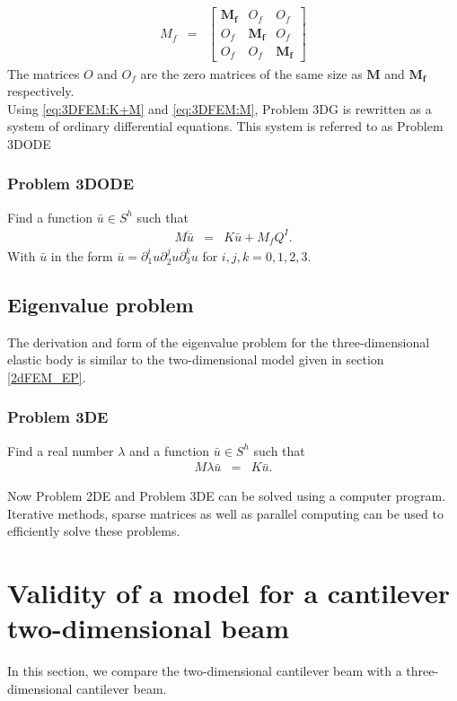 \begin{eqnarray}
	M_f & = &
	\begin{bmatrix}
		\mathbf{M_f} & {O_f} & {O_f}\\
		{O_f} & \mathbf{M_f} & {O_f}\\
		{O_f} & {O_f} & \mathbf{M_f}
	\end{bmatrix}\label{eq:3DFEM:M}
\end{eqnarray}
The matrices ${O}$ and ${O_f}$ are the zero matrices of the same size as $\mathbf{M}$ and $\mathbf{M_f}$ respectively.\\

Using \eqref{eq:3DFEM:K+M} and \eqref{eq:3DFEM:M}, Problem 3DG is rewritten as a system of ordinary differential equations. This system is referred to as Problem 3DODE

\subsubsection*{Problem 3DODE}
Find a function $\bar{u} \in S^h$ such that
\begin{eqnarray}
	M\ddot{\bar{u}} & = & K\bar{u} + M_{f}Q^I. \label{3D_M}
\end{eqnarray} With $\bar{u}$ in the form $\bar{u} = \partial^i_1u \partial^j_2u \partial^k_3u$ for $i,j,k = 0,1,2,3$.

\subsection*{Eigenvalue problem}
The derivation and form of the eigenvalue problem for the three-dimensional elastic body is similar to the two-dimensional model given in section \ref{2dFEM_EP}.

\subsubsection*{Problem 3DE}\label{3dFEM_EP}
Find a real number $\lambda$ and a function $\bar{u} \in S^h$ such that
\begin{eqnarray}
	M\lambda{\bar{u}} & = & K\bar{u}.
\end{eqnarray}

Now Problem 2DE and Problem 3DE can be solved using a computer program. Iterative methods, sparse matrices as well as parallel computing can be used to efficiently solve these problems.

\section{Validity of a model for a cantilever two-dimensional beam} \label{sec:validity-of-a-2d-beam}
In this section, we compare the two-dimensional cantilever beam with a three-dimensional cantilever beam.

